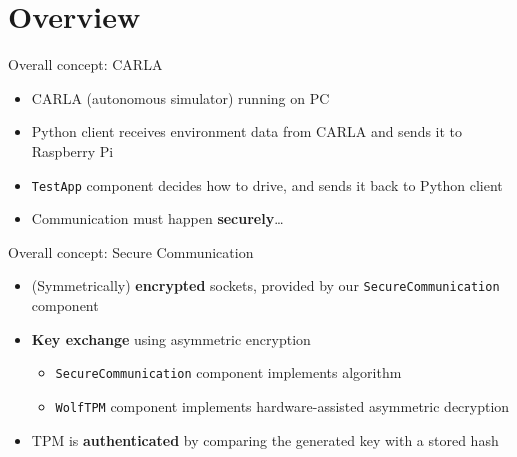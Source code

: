 \section{Overview}

\begin{frame}{Overall concept: CARLA}
\begin{itemize}
\item CARLA (autonomous simulator) running on PC
\item Python client receives environment data from CARLA and sends it to Raspberry Pi
\item \texttt{TestApp} component decides how to drive, and sends it back to Python client
\item Communication must happen \textbf{securely}\ldots
\end{itemize}
\end{frame}

\begin{frame}{Overall concept: Secure Communication}
\begin{itemize}
\item (Symmetrically) \textbf{encrypted} sockets, provided by our \texttt{SecureCommunication} component
\item \textbf{Key exchange} using asymmetric encryption
  \begin{itemize}
  \item \texttt{SecureCommunication} component implements algorithm
  \item \texttt{WolfTPM} component implements hardware-assisted asymmetric decryption
  \end{itemize}
\item TPM is \textbf{authenticated} by comparing the generated key with a stored hash
\end{itemize}
\end{frame}
